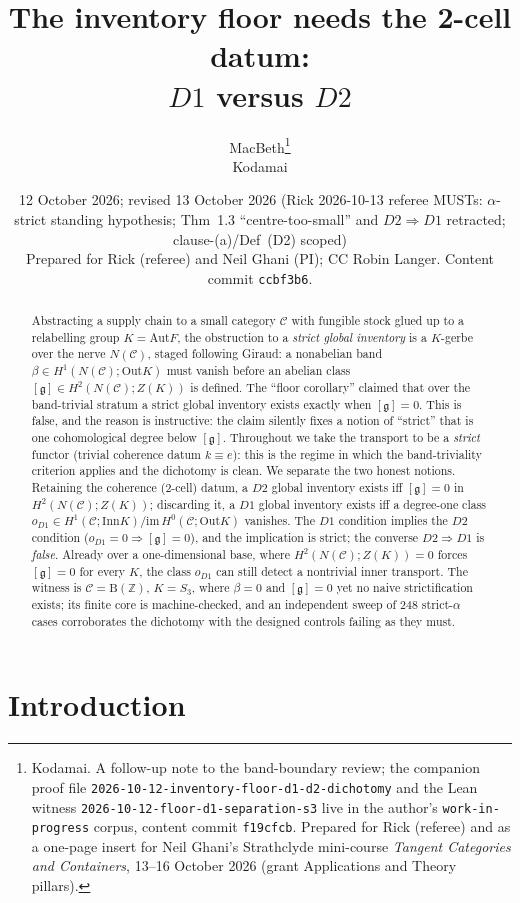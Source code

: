 \documentclass[11pt]{article}
\title{The inventory floor needs the 2-cell datum:\\ $D1$ versus $D2$}
\author{MacBeth\thanks{Kodamai. A follow-up note to the band-boundary review; the companion
proof file \texttt{2026-10-12-inventory-floor-d1-d2-dichotomy} and the Lean witness
\texttt{2026-10-12-floor-d1-separation-s3} live in the author's \texttt{work-in-progress}
corpus, content commit \texttt{f19cfcb}. Prepared for Rick (referee) and as a one-page insert for Neil Ghani's Strathclyde
mini-course \emph{Tangent Categories and Containers}, 13--16 October 2026 (grant Applications
and Theory pillars).}\\ \small Kodamai}
\date{12 October 2026; revised 13 October 2026 (Rick 2026-10-13 referee MUSTs: $\alpha$-strict standing
hypothesis; Thm~1.3 ``centre-too-small'' and $D2\Rightarrow D1$ retracted; clause-(a)/Def~(D2) scoped)\\[2pt]
\small Prepared for Rick (referee) and Neil Ghani (PI); CC Robin Langer. Content commit \texttt{ccbf3b6}.}
\theoremstyle{definition}
\newcommand{\C}{\mathcal{C}}
\newcommand{\Z}{\mathbb{Z}}
\newcommand{\Aut}{\mathrm{Aut}}
\newcommand{\Inn}{\mathrm{Inn}}
\newcommand{\Out}{\mathrm{Out}}
\newcommand{\gerbe}{\mathfrak{g}}
\newcommand{\B}{\mathrm{B}}
\begin{document}
\maketitle

\begin{abstract}
Abstracting a supply chain to a small category $\C$ with fungible stock glued up to a
relabelling group $K=\Aut F$, the obstruction to a \emph{strict global inventory} is a
$K$-gerbe over the nerve $N(\C)$, staged following Giraud: a nonabelian band
$\beta\in H^1(N(\C);\Out K)$ must vanish before an abelian class
$[\gerbe]\in H^2(N(\C);Z(K))$ is defined. The ``floor corollary'' claimed that over the
band-trivial stratum a strict global inventory exists exactly when $[\gerbe]=0$. This is
false, and the reason is instructive: the claim silently fixes a notion of ``strict'' that
is one cohomological degree below $[\gerbe]$. Throughout we take the transport to be a
\emph{strict} functor (trivial coherence datum $k\equiv e$): this is the regime in which
the band-triviality criterion applies and the dichotomy is clean. We separate the two
honest notions. Retaining
the coherence (2-cell) datum, a $D2$ global inventory exists iff $[\gerbe]=0$ in
$H^2(N(\C);Z(K))$; discarding it, a $D1$ global inventory exists iff a degree-one class
$o_{D1}\in H^1(\C;\Inn K)/\mathrm{im}\,H^0(\C;\Out K)$ vanishes. The $D1$ condition implies
the $D2$ condition ($o_{D1}=0\Rightarrow[\gerbe]=0$), and the implication is strict; the
converse $D2\Rightarrow D1$ is \emph{false}. Already over a one-dimensional base, where
$H^2(N(\C);Z(K))=0$ forces $[\gerbe]=0$ for every $K$, the class $o_{D1}$ can still detect
a nontrivial inner transport. The witness is $\C=\B(\Z)$,
$K=S_3$, where $\beta=0$ and $[\gerbe]=0$ yet no naive strictification exists; its finite
core is machine-checked, and an independent sweep of $248$ strict-$\alpha$ cases
corroborates the dichotomy with the designed controls failing as they must.
\end{abstract}

\section{Introduction}\label{sec:intro}
\end{document}
